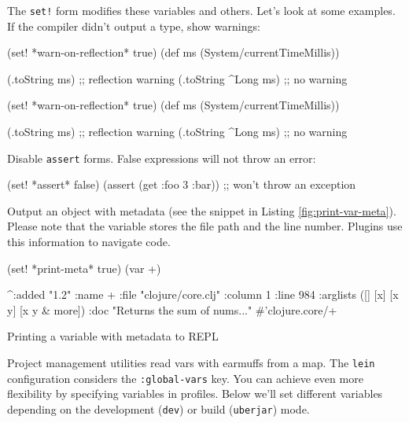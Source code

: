 The \verb|set!| form modifies these variables and others.
Let's look at some examples.
If the compiler didn't output a type, show warnings:

\ifx\DEVICETYPE\MOBILE

\begin{clojure}
(set! *warn-on-reflection* true)
(def ms (System/currentTimeMillis))

(.toString ms) ;; reflection warning
(.toString ^Long ms) ;; no warning
\end{clojure}

\else

\begin{clojure}
(set! *warn-on-reflection* true)
(def ms (System/currentTimeMillis))

(.toString ms)       ;; reflection warning
(.toString ^Long ms) ;; no warning
\end{clojure}

\fi

\noindent
Disable \verb|assert| forms.
False expressions will not throw an error:

\begin{clojure}
(set! *assert* false)
(assert (get {:foo 3} :bar))
;; won't throw an exception
\end{clojure}

\noindent
Output an object with metadata (see the snippet in Listing \ref{fig:print-var-meta}).
Please note that the variable stores the file path and the line number. Plugins use this information to navigate code.

\begin{listing}[ht!]

\begin{clojure}
(set! *print-meta* true)
(var +)

^{:added "1.2"
  :name +
  :file "clojure/core.clj"
  :column 1
  :line 984
  :arglists ([] [x] [x y] [x y & more])
  :doc "Returns the sum of nums..."}
#'clojure.core/+
\end{clojure}

\caption{Printing a variable with metadata to REPL}
\label{fig:print-var-meta}

\end{listing}


Project management utilities read vars with earmuffs from a map.
The \verb|lein| configuration considers the \verb|:global-vars| key.
You can achieve even more flexibility by specifying variables in profiles.
Below we'll set different variables depending on the development (\verb|dev|) or build (\verb|uberjar|) mode.

